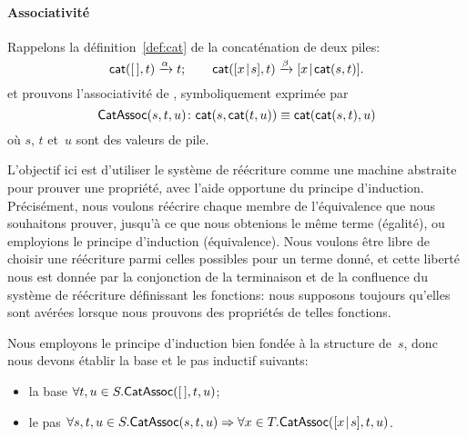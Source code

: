 \paragraph{Associativité}
\label{proof_assoc_cat}

Rappelons la définition~\eqref{def:cat} de la concaténation de deux
piles:
\begin{equation*}
\fun{cat}(        \el,t) \xrightarrow{\smash{\alpha}} t;\qquad
\fun{cat}(\cons{x}{s},t) \xrightarrow{\smash{\beta}}
\cons{x}{\fun{cat}(s,t)}.
\index{stack!concatenation!definition}
\end{equation*}
et prouvons l'associativité
 de ,
symboliquement exprimée par
\begin{equation*}
  \pred{CatAssoc}{s,t,u} \colon
\fun{cat}(s,\fun{cat}(t,u)) \equiv
\fun{cat}(\fun{cat}(s,t),u)
\index{CatAssoc@\predName{CatAssoc}|(}
\end{equation*}
où \(s\), \(t\) et~\(u\) sont des valeurs de pile.

L'objectif ici est d'utiliser le système de réécriture comme une
machine abstraite pour prouver une propriété, avec l'aide opportune du
principe d'induction. Précisément, nous voulons réécrire chaque membre
de l'équivalence que nous souhaitons prouver, jusqu'à ce que nous
obtenions le même terme (égalité), ou employions le principe
d'induction (équivalence). Nous voulons être libre de choisir une
réécriture parmi celles possibles pour un terme donné, et cette
liberté nous est donnée par la conjonction de la terminaison et de la
confluence du système de réécriture définissant les fonctions: nous
supposons toujours qu'elles sont avérées lorsque nous prouvons des
propriétés de telles fonctions.

Nous employons le principe d'induction bien fondée à la structure
de~\(s\), donc nous devons établir la base et le pas inductif
suivants:
\begin{itemize}

  \item la base \(\forall t,u \in S.\textsf{CatAssoc}({[\,],t,u})\);

  \item le pas \(\forall s,t,u \in S.\textsf{CatAssoc}({s,t,u})
    \Rightarrow \forall x \in T.\textsf{CatAssoc}({[{x}\!\mid\!{s}],t,u})\).

\end{itemize}

